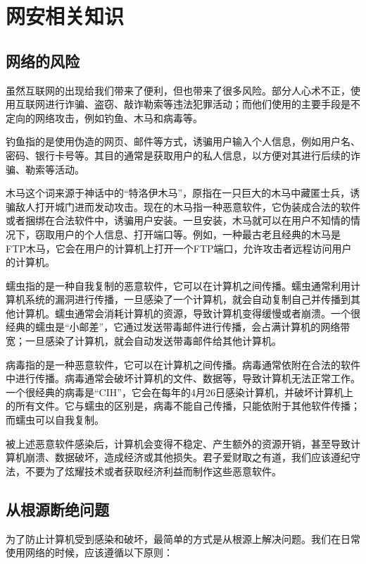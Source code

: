 \section{网安相关知识} %

\subsection{网络的风险}

虽然互联网的出现给我们带来了便利，但也带来了很多风险。部分人心术不正，使用互联网进行诈骗、盗窃、敲诈勒索等违法犯罪活动；而他们使用的主要手段是不定向的网络攻击，例如钓鱼、木马和病毒等。

钓鱼指的是使用伪造的网页、邮件等方式，诱骗用户输入个人信息，例如用户名、密码、银行卡号等。其目的通常是获取用户的私人信息，以方便对其进行后续的诈骗、勒索等活动。

木马这个词来源于神话中的“特洛伊木马”，原指在一只巨大的木马中藏匿士兵，诱骗敌人打开城门进而发动攻击。现在的木马指一种恶意软件，它伪装成合法的软件或者捆绑在合法软件中，诱骗用户安装。一旦安装，木马就可以在用户不知情的情况下，窃取用户的个人信息、打开端口等。例如，一种最古老且经典的木马是FTP木马，它会在用户的计算机上打开一个FTP端口，允许攻击者远程访问用户的计算机。

蠕虫指的是一种自我复制的恶意软件，它可以在计算机之间传播。蠕虫通常利用计算机系统的漏洞进行传播，一旦感染了一个计算机，就会自动复制自己并传播到其他计算机。蠕虫通常会消耗计算机的资源，导致计算机变得缓慢或者崩溃。一个很经典的蠕虫是“小邮差”，它通过发送带毒邮件进行传播，会占满计算机的网络带宽；一旦感染了计算机，就会自动发送带毒邮件给其他计算机。

病毒指的是一种恶意软件，它可以在计算机之间传播。病毒通常依附在合法的软件中进行传播。病毒通常会破坏计算机的文件、数据等，导致计算机无法正常工作。一个很经典的病毒是“CIH”，它会在每年的4月26日感染计算机，并破坏计算机上的所有文件。它与蠕虫的区别是，病毒不能自己传播，只能依附于其他软件传播；而蠕虫可以自我复制。

被上述恶意软件感染后，计算机会变得不稳定、产生额外的资源开销，甚至导致计算机崩溃、数据破坏，造成经济或其他损失。君子爱财取之有道，我们应该遵纪守法，不要为了炫耀技术或者获取经济利益而制作这些恶意软件。

\subsection{从根源断绝问题}

为了防止计算机受到感染和破坏，最简单的方式是从根源上解决问题。我们在日常使用网络的时候，应该遵循以下原则：

